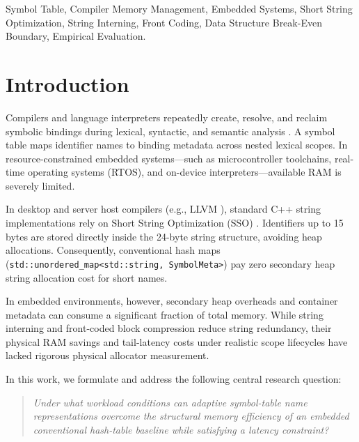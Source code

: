 \documentclass[conference]{IEEEtran}
\begin{document}
\begin{IEEEkeywords}
Symbol Table, Compiler Memory Management, Embedded Systems, Short String Optimization, String Interning, Front Coding, Data Structure Break-Even Boundary, Empirical Evaluation.
\end{IEEEkeywords}

\section{Introduction}
Compilers and language interpreters repeatedly create, resolve, and reclaim symbolic bindings during lexical, syntactic, and semantic analysis \cite{aho}. A symbol table maps identifier names to binding metadata across nested lexical scopes. In resource-constrained embedded systems---such as microcontroller toolchains, real-time operating systems (RTOS), and on-device interpreters---available RAM is severely limited.

In desktop and server host compilers (e.g., LLVM \cite{lattner2004llvm}), standard C++ string implementations rely on Short String Optimization (SSO) \cite{meyers2001effective, sutter2004exceptional}. Identifiers up to 15 bytes are stored directly inside the 24-byte string structure, avoiding heap allocations. Consequently, conventional hash maps (\texttt{std::unordered\_map<std::string, SymbolMeta>}) pay zero secondary heap string allocation cost for short names.

In embedded environments, however, secondary heap overheads and container metadata can consume a significant fraction of total memory. While string interning \cite{gosling2014java, vanrossum2009python} and front-coded block compression \cite{witten1999managing, brisaboa2011compressed} reduce string redundancy, their physical RAM savings and tail-latency costs under realistic scope lifecycles have lacked rigorous physical allocator measurement.

In this work, we formulate and address the following central research question:
\begin{quote}
\emph{Under what workload conditions can adaptive symbol-table name representations overcome the structural memory efficiency of an embedded conventional hash-table baseline while satisfying a latency constraint?}
\end{quote}
\end{document}
